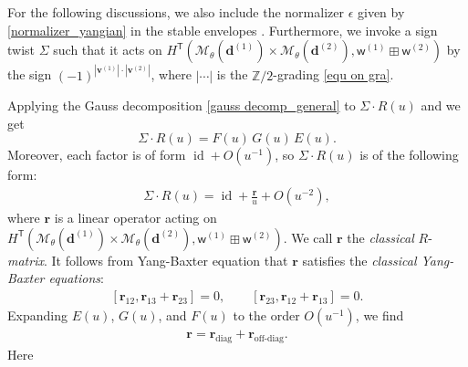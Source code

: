 \documentclass[10pt]{amsart}
\theoremstyle{definition}
\numberwithin{equation}{section}
\newcommand{\bZ}{\mathbb{Z}}
\newcommand{\bv}{\mathbf{v}}
\newcommand{\bd}{\mathbf{d}}
\newcommand{\cM}{\mathcal{M}}
\newcommand{\sT}{\mathsf{T}}
\newcommand{\sw}{\mathsf{w}}
\newcommand{\diag}{\operatorname{diag}}
\newcommand{\id}{\operatorname{id}}
\begin{document}
For the following discussions, we also include the  normalizer $\epsilon$ given by \eqref{normalizer_yangian} in the stable envelopes \cite[Def.~3.5]{COZZ}. Furthermore, we invoke a sign twist $\Sigma$ such that it acts on $H^{\sT}(\cM_\theta(\bd^{(1)})\times\cM_\theta(\bd^{(2)}),\sw^{(1)}\boxplus\sw^{(2)})$ by the sign $(-1)^{|\bv^{(1)}|\cdot |\bv^{(2)}|}$, where $|\cdots|$ is the $\bZ/2$-grading \eqref{equ on gra}. 

Applying the Gauss decomposition \eqref{gauss decomp_general} to $\Sigma\cdot R(u)$ and we get 
$$\Sigma\cdot R(u)=F(u)\,G(u)\,E(u). $$ Moreover, each factor is of form $\id+O(u^{-1})$, so $\Sigma\cdot R(u)$ is of the following form:
\begin{align}\label{expansion_classical r}
    \Sigma\cdot R(u)=\id+\frac{\pmb r}{u}+O(u^{-2}),
\end{align}
where $\pmb r$ is a linear operator acting on $H^{\sT}(\cM_\theta(\bd^{(1)})\times\cM_\theta(\bd^{(2)}),\sw^{(1)}\boxplus\sw^{(2)})$. 
We call $\pmb r$ the \textit{classical} $R$-\textit{matrix}. It follows from Yang-Baxter equation that $\pmb r$ satisfies the \textit{classical Yang-Baxter equations}:
\begin{align}\label{CYBE}
    [\pmb r_{12},\pmb r_{13}+\pmb r_{23}]=0,\qquad [\pmb r_{23},\pmb r_{12}+\pmb r_{13}]=0.
\end{align}
Expanding $E(u)$, $G(u)$, and $F(u)$ to the order $O(u^{-1})$, we find
\begin{align*}
    \pmb r=\pmb r_{\diag}+\pmb r_{\text{off-diag}}.
\end{align*}
Here 
\end{document}
